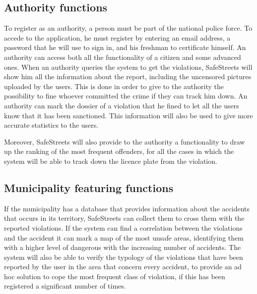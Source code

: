 \documentclass[../RASD.tex]{subfiles}
\begin{document}
    \subsection{Authority functions}\label{subsec:authority-functions}
    To register as an authority, a person must be part of the national police force.
    To accede to the application, he must register by entering an email address, a password that he will use to sign in, and his freshman to certificate himself.
    An authority can access both all the functionality of a citizen and some advanced ones.
    When an authority queries the system to get the violations, SafeStreets will show him all the information about the report, including the uncensored pictures uploaded by the users. This is done in order to give to the authority the possibility to fine whoever committed the crime if they can track him down. An authority can mark the dossier of a violation that he fined to let all the users know that it has been sanctioned. This information will also be used to give more accurate statistics to the users.

    Moreover, SafeStreets will also provide to the authority a functionality to draw up the ranking of the most frequent offenders, for all the cases in which the system will be able to track down the licence plate from the violation.
    \subsection{Municipality featuring functions}\label{subsec:municipality-featuring-functions}
    If the municipality has a database that provides information about the accidents that occurs in its territory,
    SafeStreets can collect them to cross them with the reported violations. If the system can find a correlation between the violations and the accident it can mark a map of the most unsafe areas, identifying them with a higher level of dangerous with the increasing number of accidents. The system will also be able to verify the typology of the violations that have been reported by the user in the area that concern every accident, to provide an ad hoc solution to cope the most frequent class of violation, if this has been registered a significant number of times.
\end{document}
